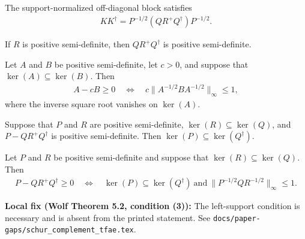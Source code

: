 \begin{theorem}
  \label{thm:schur_contraction_mul_adjoint}
  \leanok
  The support-normalized off-diagonal block satisfies
  \begin{align}
    KK^\dagger=P^{-1/2}(QR^+Q^\dagger)P^{-1/2}.
  \end{align}
\end{theorem}

\begin{theorem}
  \label{thm:schur_term_psd}
  \leanok
  If $R$ is positive semi-definite, then $QR^+Q^\dagger$ is positive
  semi-definite.
\end{theorem}

\begin{theorem}
  \label{thm:psd_congruence_norm_criterion}
  \leanok
  Let $A$ and $B$ be positive semi-definite, let $c>0$, and suppose that
  $\ker(A)\subseteq\ker(B)$. Then
  \begin{align}
    A-cB\ge0
    \quad\Longleftrightarrow\quad
    c\lVert A^{-1/2}BA^{-1/2}\rVert_\infty\le1,
  \end{align}
  where the inverse square root vanishes on $\ker(A)$.
\end{theorem}

\begin{theorem}
  \label{thm:left_support_of_schur_complement_psd}
  \leanok
  Suppose that $P$ and $R$ are positive semi-definite,
  $\ker(R)\subseteq\ker(Q)$, and $P-QR^+Q^\dagger$ is positive
  semi-definite. Then $\ker(P)\subseteq\ker(Q^\dagger)$.
\end{theorem}

\begin{theorem}
  \label{thm:schur_complement_psd_iff_corrected_contraction}
  \leanok
  Let $P$ and $R$ be positive semi-definite and suppose that
  $\ker(R)\subseteq\ker(Q)$. Then
  \begin{align}
    P-QR^+Q^\dagger\ge0
    \quad\Longleftrightarrow\quad
    \ker(P)\subseteq\ker(Q^\dagger)
    \ \text{and}\ \lVert P^{-1/2}QR^{-1/2}\rVert_\infty\le1.
  \end{align}

  \textbf{Local fix (Wolf Theorem 5.2, condition (3)):}
  The left-support condition is necessary and is absent from the printed
  statement. See
  \texttt{docs/paper-gaps/schur\_complement\_tfae.tex}.
\end{theorem}

